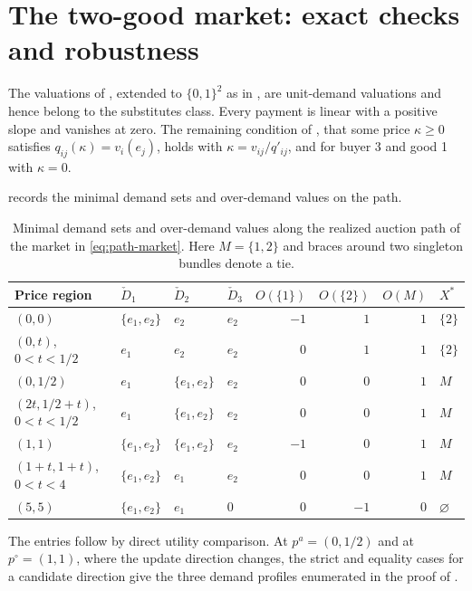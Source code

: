 \section{The two-good market: exact checks and robustness}\label{app:two-good-checks}

The valuations of , extended to $\{0,1\}^2$ as in , are unit-demand valuations and hence belong to the substitutes class. Every payment is linear with a positive slope and vanishes at zero. The remaining condition of \citet{okisato2026}, that some price $\kappa\ge0$ satisfies $q_{ij}(\kappa)=v_i(e_j)$, holds with $\kappa=v_{ij}/q'_{ij}$, and for buyer 3 and good 1 with $\kappa=0$.

 records the minimal demand sets and over-demand values on the path.
\begin{table}[!ht]
\centering
\caption{Minimal demand sets and over-demand values along the realized auction path of the market in \eqref{eq:path-market}. Here $M=\{1,2\}$ and braces around two singleton bundles denote a tie.}
\label{tab:path-checks}
\small
\begin{tabular}{@{}llllrrrl@{}}
\toprule
Price region & $\check D_1$ & $\check D_2$ & $\check D_3$
& $O(\{1\})$ & $O(\{2\})$ & $O(M)$ & $X^*$\\
\midrule
$(0,0)$ & $\{e_1,e_2\}$ & $e_2$ & $e_2$ & $-1$ & $1$ & $1$ & $\{2\}$\\
$(0,t)$, $0<t<1/2$ & $e_1$ & $e_2$ & $e_2$ & $0$ & $1$ & $1$ & $\{2\}$\\
$(0,1/2)$ & $e_1$ & $\{e_1,e_2\}$ & $e_2$ & $0$ & $0$ & $1$ & $M$\\
$(2t,1/2+t)$, $0<t<1/2$ & $e_1$ & $\{e_1,e_2\}$ & $e_2$ & $0$ & $0$ & $1$ & $M$\\
$(1,1)$ & $\{e_1,e_2\}$ & $\{e_1,e_2\}$ & $e_2$ & $-1$ & $0$ & $1$ & $M$\\
$(1+t,1+t)$, $0<t<4$ & $\{e_1,e_2\}$ & $e_1$ & $e_2$ & $0$ & $0$ & $1$ & $M$\\
$(5,5)$ & $\{e_1,e_2\}$ & $e_1$ & $0$ & $0$ & $-1$ & $0$ & $\varnothing$\\
\bottomrule
\end{tabular}
\end{table}
The entries follow by direct utility comparison. At $p^a=(0,1/2)$ and at $p^\circ=(1,1)$, where the update direction changes, the strict and equality cases for a candidate direction give the three demand profiles enumerated in the proof of .

